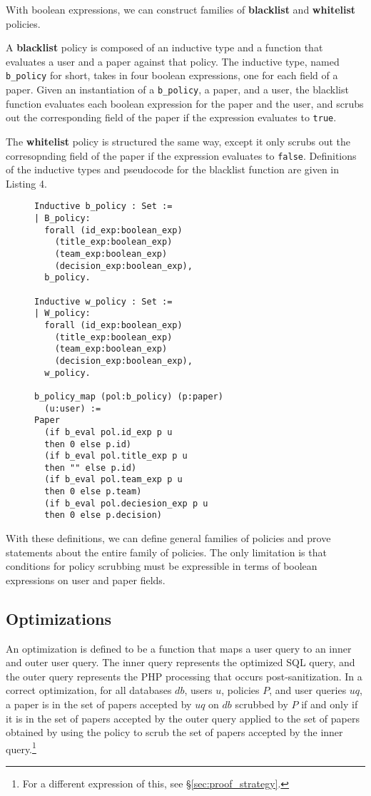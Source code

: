 \documentclass[11pt,journal]{IEEEtran}
\begin{document}
With boolean expressions, we can construct families of \textbf{blacklist} and \textbf{whitelist} policies.

A \textbf{blacklist} policy is composed of an inductive type and a function that evaluates a user and a paper against that policy.  The inductive type, named \texttt{b\_policy} for short, takes in four boolean expressions, one for each field of a paper.  Given an instantiation of a \texttt{b\_policy}, a paper, and a user, the blacklist function evaluates each boolean expression for the paper and the user, and scrubs out the corresponding field of the paper if the expression evaluates to \texttt{true}.

The \textbf{whitelist} policy is structured the same way, except it only scrubs out the corresopnding field of the paper if the expression evaluates to \texttt{false}.  Definitions of the inductive types and pseudocode for the blacklist function are given in Listing 4.
\begin{figure}
\begin{lstlisting}[caption=Blacklist and whitelist inductive types and the blacklist policy map function.]
Inductive b_policy : Set :=
| B_policy: 
  forall (id_exp:boolean_exp)
    (title_exp:boolean_exp)
    (team_exp:boolean_exp)
    (decision_exp:boolean_exp),
  b_policy.

Inductive w_policy : Set :=
| W_policy: 
  forall (id_exp:boolean_exp)
    (title_exp:boolean_exp)
    (team_exp:boolean_exp)
    (decision_exp:boolean_exp),
  w_policy.

b_policy_map (pol:b_policy) (p:paper)
  (u:user) :=
Paper
  (if b_eval pol.id_exp p u
  then 0 else p.id)
  (if b_eval pol.title_exp p u
  then "" else p.id)
  (if b_eval pol.team_exp p u
  then 0 else p.team)
  (if b_eval pol.deciesion_exp p u
  then 0 else p.decision)
\end{lstlisting}
\end{figure}
With these definitions, we can define general families of policies and prove statements about the entire family of policies.  The only limitation is that conditions for policy scrubbing must be expressible in terms of boolean expressions on user and paper fields.

\subsection{Optimizations}
\label{sec:optimizations}

An optimization is defined to be a function that maps a user query to an inner and outer user query.  The inner query represents the optimized SQL query, and the outer query represents the PHP processing that occurs post-sanitization.  In a correct optimization, for all databases $db$, users $u$, policies $P$, and user queries $uq$, a paper is in the set of papers accepted by $uq$ on $db$ scrubbed by $P$ if and only if it is in the set of papers accepted by the outer query applied to the set of papers obtained by using the policy to scrub the set of papers accepted by the inner query.\footnote{For a different expression of this, see \S\ref{sec:proof_strategy}.}
\end{document}
